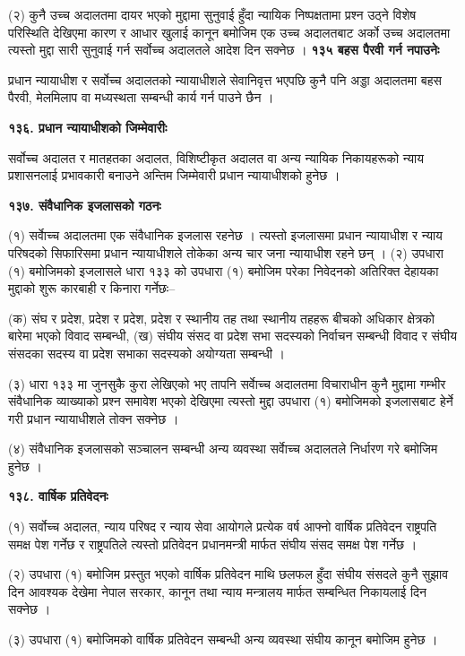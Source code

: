 (२) कुनै उच्च अदालतमा दायर भएको मुद्दामा सुनुवाई हुँदा न्यायिक निष्पक्षतामा प्रश्न उठ्ने विशेष परिस्थिति देखिएमा कारण र आधार खुलाई कानून बमोजिम एक उच्च अदालतबाट अर्को उच्च अदालतमा त्यस्तो मुद्दा सारी सुनुवाई गर्न सर्वोच्च अदालतले आदेश दिन सक्नेछ ।
\textbf{१३५ बहस पैरवी गर्न नपाउनेः}

प्रधान न्यायाधीश र सर्वोच्च अदालतको न्यायाधीशले सेवानिवृत्त भएपछि कुनै पनि अड्डा अदालतमा बहस पैरवी, मेलमिलाप वा मध्यस्थता सम्बन्धी कार्य गर्न पाउने छैन ।

\textbf{१३६. प्रधान न्यायाधीशको जिम्मेवारीः}

सर्वोच्च अदालत र मातहतका अदालत, विशिष्टीकृत अदालत वा अन्य न्यायिक निकायहरूको न्याय प्रशासनलाई प्रभावकारी बनाउने अन्तिम जिम्मेवारी प्रधान न्यायाधीशको हुनेछ ।

\textbf{१३७. संवैधानिक इजलासको गठनः}

(१) सर्वाेच्च अदालतमा एक संवैधानिक इजलास रहनेछ । त्यस्तो इजलासमा प्रधान न्यायाधीश र न्याय परिषदको सिफारिसमा प्रधान न्यायाधीशले तोकेका अन्य चार जना न्यायाधीश रहने छन् ।
(२) उपधारा (१) बमोजिमको इजलासले धारा १३३ को उपधारा (१) बमोजिम परेका निवेदनको अतिरिक्त देहायका मुद्दाको शुरू कारबाही र
किनारा गर्नेछः–

(क) संघ र प्रदेश, प्रदेश र प्रदेश, प्रदेश र स्थानीय तह तथा स्थानीय तहहरू बीचको अधिकार क्षेत्रको बारेमा भएको विवाद सम्बन्धी,
(ख) संघीय संसद वा प्रदेश सभा सदस्यको निर्वाचन सम्बन्धी विवाद र संघीय संसदका सदस्य वा प्रदेश सभाका सदस्यको अयोग्यता सम्बन्धी ।

(३) धारा १३३ मा जुनसुकै कुरा लेखिएको भए तापनि सर्वाेच्च अदालतमा विचाराधीन कुनै मुद्दामा गम्भीर संवैधानिक व्याख्याको प्रश्न समावेश भएको देखिएमा त्यस्तो मुद्दा उपधारा (१) बमोजिमको इजलासबाट हेर्ने गरी प्रधान न्यायाधीशले तोक्न सक्नेछ ।

(४) संवैधानिक इजलासको सञ्चालन सम्बन्धी अन्य व्यवस्था सर्वाेच्च अदालतले निर्धारण गरे बमोजिम हुनेछ ।

\textbf{१३८. वार्षिक प्रतिवेदनः}

(१) सर्वोच्च अदालत, न्याय परिषद र न्याय सेवा आयोगले प्रत्येक वर्ष आफ्नो वार्षिक प्रतिवेदन राष्ट्रपति समक्ष पेश गर्नेछ र राष्ट्रपतिले त्यस्तो प्रतिवेदन प्रधानमन्त्री मार्फत संघीय संसद समक्ष पेश गर्नेछ ।

(२) उपधारा (१) बमोजिम प्रस्तुत भएको वार्षिक प्रतिवेदन माथि छलफल हुँदा संघीय संसदले कुनै सुझाव दिन आवश्यक देखेमा नेपाल
सरकार, कानून तथा न्याय मन्त्रालय मार्फत सम्बन्धित निकायलाई दिन सक्नेछ ।

(३) उपधारा (१) बमोजिमको वार्षिक प्रतिवेदन सम्बन्धी अन्य व्यवस्था संघीय कानून बमोजिम हुनेछ ।

